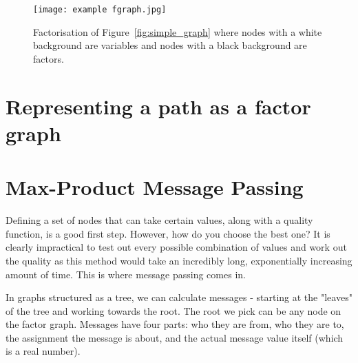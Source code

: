 \begin{figure}[h]
    \centering
    \texttt{[image: example fgraph.jpg]}
    \caption{Factorisation of Figure~\ref{fig:simple_graph} where nodes with a white background are variables and nodes with a black background are factors.}
    \label{fig:simple_fgraph}
\end{figure}

\section{Representing a path as a factor graph}
\label{sec:path_as_fg}


\section{Max-Product Message Passing}
\label{sec:mpmp}
Defining a set of nodes that can take certain values, along with a quality function, is a good first step.
However, how do you choose the best one?
It is clearly impractical to test out every possible combination of values and work out the quality as this method would take an incredibly long, exponentially increasing amount of time.
This is where message passing comes in.

In graphs structured as a tree, we can calculate messages - starting at the "leaves" of the tree and working towards the root.
The root we pick can be any node on the factor graph.
Messages have four parts: who they are from, who they are to, the assignment the message is about, and the actual message value itself (which is a real number).
